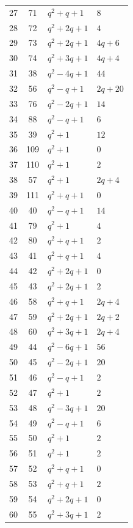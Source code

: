 \documentclass[a4paper, 11pt, reqno]{amsart}
\numberwithin{equation}{section} \numberwithin{figure}{section}
\theoremstyle{definition}
\numberwithin{lemma}{section}
\begin{document}
\begin{longtable}[h]{|c|c|l|l|}
27 & 71 & $q^2 + q + 1$ & $8$ \\
28 & 72 & $q^2 + 2q + 1$ & $4$ \\
29 & 73 & $q^2 + 2q + 1$ & $4q + 6$ \\
30 & 74 & $q^2 + 3q + 1$ & $4q + 4$ \\
31 & 38 & $q^2 - 4q + 1$ & $44$ \\
32 & 56 & $q^2 - q + 1$ & $2q + 20$ \\
33 & 76 & $q^2 - 2q + 1$ & $14$ \\
34 & 88 & $q^2 - q + 1$ & $6$ \\
35 & 39 & $q^2 + 1$ & $12$ \\
36 & 109 & $q^2 + 1$ & $0$ \\
37 & 110 & $q^2 + 1$ & $2$ \\
38 & 57 & $q^2 + 1$ & $2q + 4$ \\
39 & 111 & $q^2 + q + 1$ & $0$ \\
40 & 40 & $q^2 - q + 1$ & $14$ \\
41 & 79 & $q^2 + 1$ & $4$ \\
42 & 80 & $q^2 + q + 1$ & $2$ \\
43 & 41 & $q^2 + q + 1$ & $4$ \\
44 & 42 & $q^2 + 2q + 1$ & $0$ \\
45 & 43 & $q^2 + 2q + 1$ & $2$ \\
46 & 58 & $q^2 + q + 1$ & $2q + 4$ \\
47 & 59 & $q^2 + 2q + 1$ & $2q + 2$ \\
48 & 60 & $q^2 + 3q + 1$ & $2q + 4$ \\
49 & 44 & $q^2 - 6q + 1$ & $56$ \\
50 & 45 & $q^2 - 2q + 1$ & $20$ \\
51 & 46 & $q^2 - q + 1$ & $2$ \\
52 & 47 & $q^2 + 1$ & $2$ \\
53 & 48 & $q^2 - 3q + 1$ & $20$ \\
54 & 49 & $q^2 - q + 1$ & $6$ \\
55 & 50 & $q^2 + 1$ & $2$ \\
56 & 51 & $q^2 + 1$ & $2$ \\
57 & 52 & $q^2 + q + 1$ & $0$ \\
58 & 53 & $q^2 + q + 1$ & $2$ \\
59 & 54 & $q^2 + 2q + 1$ & $0$ \\
60 & 55 & $q^2 + 3q + 1$ & $2$\\
\hline
\end{longtable}
\end{document}
